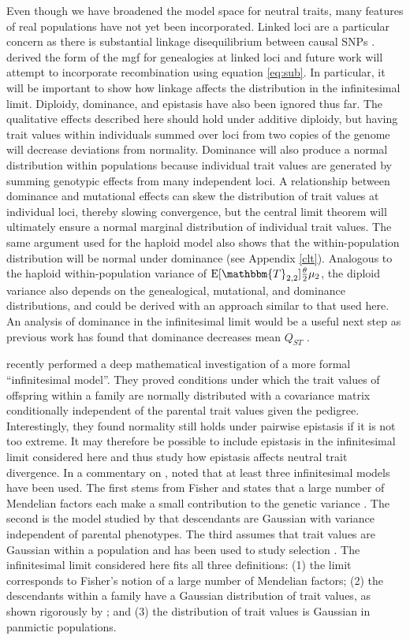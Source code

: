Even though we have broadened the model space for neutral traits, many features
of real populations have not yet been incorporated. Linked loci are a particular
concern as there is substantial linkage disequilibrium between causal
SNPs \citep{Bulik-Sullivan2015}. \citet{Lohse2011} derived the form of the mgf
for genealogies at linked loci and future work will attempt to incorporate
recombination using equation \eqref{eq:sub}. In particular, it will be important
to show how linkage affects the distribution in the infinitesimal limit.
Diploidy, dominance, and epistasis have also been ignored thus far. The
qualitative effects described here should hold under additive diploidy, but
having trait values within individuals summed over loci from two copies of the
genome will decrease deviations from normality. Dominance will also produce a
normal distribution within populations because individual trait values are
generated by summing genotypic effects from many independent loci. A
relationship between dominance and mutational effects can skew the distribution
of trait values at individual loci, thereby slowing convergence, but the central
limit theorem will ultimately ensure a normal marginal distribution of
individual trait values. The same argument used for the haploid model also shows
that the within-population distribution will be normal under dominance (see
Appendix \ref{clt}). Analogous to the haploid within-population variance of
$\E[\mathbbm{T}_{2,2}]\T\mu_2$, the diploid variance also depends on the
genealogical, mutational, and dominance distributions, and could be derived with
an approach similar to that used here. An analysis of dominance in the
infinitesimal limit would be a useful next step as previous work has found that
dominance decreases mean $Q_{ST}$ \citep{Goudet2006}.

\citet{Barton2017} recently performed a deep mathematical investigation of a
more formal ``infinitesimal model''. They proved conditions under which the
trait values of offspring within a family are normally distributed with a
covariance matrix conditionally independent of the parental trait values given
the pedigree. Interestingly, they found normality still holds under pairwise
epistasis if it is not too extreme. It may therefore be possible to include
epistasis in the infinitesimal limit considered here and thus study how
epistasis affects neutral trait divergence. In a commentary on
\citet{Barton2017}, \citet{Turelli2017} noted that at least three
infinitesimal models have been used. The first stems from Fisher and states that
a large number of Mendelian factors each make a small contribution to the
genetic variance \citep{Fisher1918}. The second is the model studied
by \citet{Barton2017} that descendants are Gaussian with variance independent of
parental phenotypes. The third assumes that trait values are Gaussian within a
population and has been used to study selection \citep{Bulmer1971}. The
infinitesimal limit considered here fits all three definitions: (1) the limit
corresponds to Fisher's notion of a large number of Mendelian factors; (2) the
descendants within a family have a Gaussian distribution of trait values, as
shown rigorously by \citet{Barton2017}; and (3) the distribution of trait values
is Gaussian in panmictic populations.

